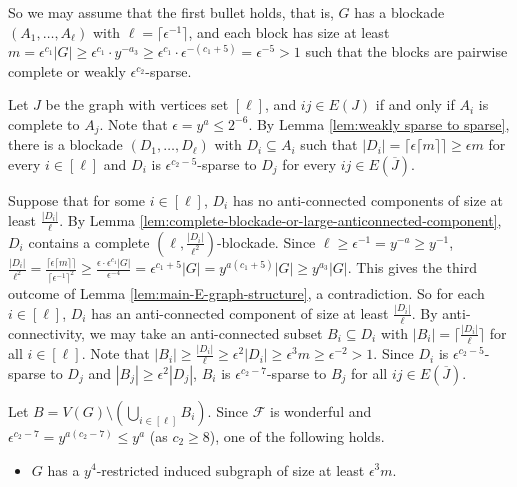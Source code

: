 \documentclass[a4paper,11pt]{article}
\let\oldendproof\endproof
\renewenvironment{proof}[1][\proofname]{%
	\oldproof[\normalfont\bfseries #1]%
}{\oldendproof}
\begin{document}
\begin{proof}
        So we may assume that the first bullet holds, that is, $G$ has a blockade $(A_1,\ldots,A_\ell)$ with $\ell=\lceil \epsilon^{-1}\rceil$, and each block has size at least $m= \epsilon^{c_1}|G|\geq \epsilon^{c_1}\cdot y^{-a_3}\geq \epsilon^{c_1}\cdot \epsilon^{-(c_1+5)}= \epsilon^{-5}>1$ such that the blocks are pairwise complete or weakly $\epsilon^{c_2}$-sparse.
        
        Let $J$ be the graph with vertices set $[\ell]$, and $ij\in E(J)$ if and only if $A_i$ is complete to $A_j$. 
        Note that $\epsilon=y^a\leq 2^{-6}$. 
        By Lemma \ref{lem:weakly sparse to sparse}, there is a blockade $(D_1,\ldots,D_\ell)$ with $D_i\subseteq A_i$ such that $|D_i|=\lceil\epsilon \lceil m\rceil\rceil\geq \epsilon m$ for every $i\in [\ell]$ and $D_i$ is $\epsilon^{c_2-5}$-sparse to $D_j$ for every $ij\in E(\overline{J})$.
        
        Suppose that for some $i\in[\ell]$, $D_i$ has no anti-connected components of size at least $\frac{|D_i|}{\ell}$. 
        By Lemma \ref{lem:complete-blockade-or-large-anticonnected-component}, $D_i$ contains a complete $(\ell,\frac{|D_i|}{\ell^2})$-blockade. 
        Since $\ell\geq \epsilon^{-1}= y^{-a}\geq y^{-1}$, $\frac{|D_i|}{\ell^2}=\frac{\lceil\epsilon \lceil m\rceil\rceil}{\lceil \epsilon^{-1}\rceil^2}\geq \frac{\epsilon\cdot \epsilon^{c_1}|G|}{\epsilon^{-4}}= \epsilon^{c_1+5}|G|=y^{a(c_1+5)}|G|\geq y^{a_3}|G|$. 
        This gives the third outcome of Lemma \ref{lem:main-E-graph-structure}, a contradiction. 
        So for each $i\in[\ell]$, $D_i$ has an anti-connected component of size at least $\frac{|D_i|}{\ell}$. 
        By anti-connectivity, we may take an anti-connected subset $B_i\subseteq D_i$ with $|B_i|=\lceil \frac{|D_i|}{\ell} \rceil$ for all $i\in [\ell]$. Note that
        $|B_i|\ge \frac{|D_i|}{\ell}\geq \epsilon^2 |D_i|\ge \epsilon ^3 m\ge \epsilon^{-2}>1$. 
        Since $D_i$ is $\epsilon^{c_2-5}$-sparse to $D_j$ and $|B_j|\geq \epsilon^2 |D_j|$, $B_i$ is $\epsilon^{c_2-7}$-sparse to $B_j$ for all $ij\in E(\overline{J})$.

        Let $B=V(G)\setminus(\bigcup_{i\in[\ell]}B_i)$. 
        Since $\mathcal{F}$ is wonderful and $\epsilon^{c_2-7}= y^{a(c_2-7)}\leq y^a$ (as $c_2\ge 8$), one of the following holds. 
        \begin{itemize}
            
            \item $G$ has a $y^{4}$-restricted induced subgraph of size at least $\epsilon^3m$.  
            

\end{itemize}
\end{proof}
\end{document}
